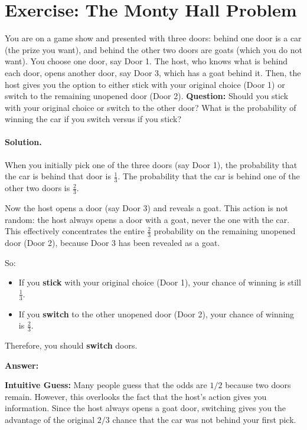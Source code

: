 \documentclass[11pt]{article}
\newif\ifshowanswers
\begin{document}
\section{Exercise: The Monty Hall Problem}

You are on a game show and presented with three doors: behind one door is a car (the prize you want), and behind the other two doors are goats (which you do not want). You choose one door, say Door 1. The host, who knows what is behind each door, opens another door, say Door 3, which has a goat behind it.
Then, the host gives you the option to either stick with your original choice (Door 1) or switch to the remaining unopened door (Door 2).
\noindent
\textbf{Question:} Should you stick with your original choice or switch to the other door? What is the probability of winning the car if you switch versus if you stick?

\ifshowanswers
\paragraph{Solution.}

When you initially pick one of the three doors (say Door 1), the probability that the car is behind that door is $\frac{1}{3}$.
The probability that the car is behind one of the other two doors is $\frac{2}{3}$.

Now the host opens a door (say Door 3) and reveals a goat. This action is not random: the host always opens a door with a goat, never the one with the car.
This effectively concentrates the entire $\frac{2}{3}$ probability on the remaining unopened door (Door 2), because Door 3 has been revealed as a goat.

So:

\begin{itemize}
  \item If you \textbf{stick} with your original choice (Door 1), your chance of winning is still $\frac{1}{3}$.
  \item If you \textbf{switch} to the other unopened door (Door 2), your chance of winning is $\frac{2}{3}$.
\end{itemize}

Therefore, you should \textbf{switch} doors.

\noindent
\textbf{Answer:} 

\noindent
\textbf{Intuitive Guess:} Many people guess that the odds are $1/2$ because two doors remain. However, this overlooks the fact that the host's action gives you information. Since the host always opens a goat door, switching gives you the advantage of the original $2/3$ chance that the car was not behind your first pick.
\end{document}
